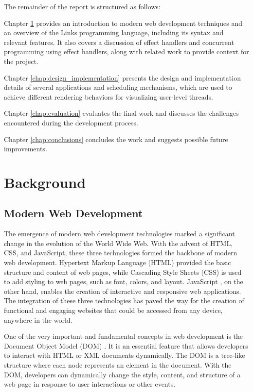 \documentclass[logo,bsc,singlespacing,parskip]{infthesis}
\begin{document}
The remainder of the report is structured as follows:

Chapter \ref{chap:background} provides an introduction to modern web development techniques and an overview of the Links programming language, including its syntax and relevant features. It also covers a discussion of effect handlers and concurrent programming using effect handlers, along with related work to provide context for the project.

Chapter \ref{chap:design_implementation} presents the design and implementation details of several applications and scheduling mechanisms, which are used to achieve different rendering behaviors for visualizing user-level threads.


Chapter \ref{chap:evaluation} evaluates the final work and discusses the challenges encountered during the development process.

Chapter \ref{chap:conclusions} concludes the work and suggests possible future improvements.

\chapter{Background}
\label{chap:background}

\section{Modern Web Development}

The emergence of modern web development technologies marked a significant change in the evolution of the World Wide Web. With the advent of HTML, CSS, and JavaScript, these three technologies formed the backbone of modern web development. Hypertext Markup Language (HTML) \cite{html} provided the basic structure and content of web pages, while Cascading Style Sheets (CSS) \cite{css} is used to add styling to web pages, such as font, colors, and layout. JavaScript \cite{javascript}, on the other hand, enables the creation of interactive and responsive web applications. The integration of these three technologies has paved the way for the creation of functional and engaging websites that could be accessed from any device, anywhere in the world.

One of the very important and fundamental concepts in web development is the Document Object Model (DOM) \cite{dom}. It is an essential feature that allows developers to interact with HTML or XML documents dynamically. The DOM is a tree-like structure where each node represents an element in the document. With the DOM, developers can dynamically change the style, content, and structure of a web page in response to user interactions or other events. 
\end{document}
